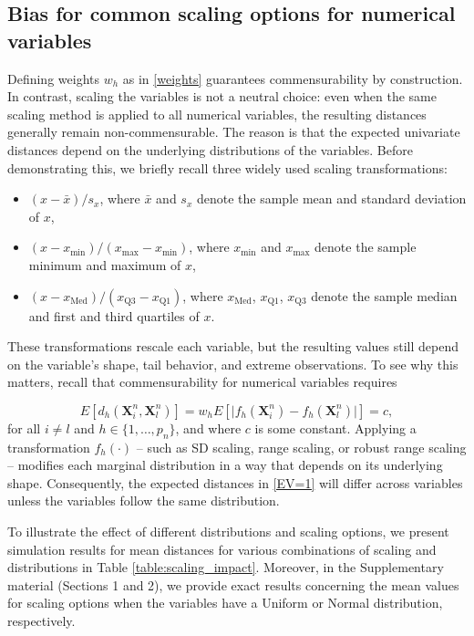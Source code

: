 \documentclass[12pt]{article}
\begin{document}
\subsection{Bias for common scaling options for numerical variables}\label{sect:comnumdist}
Defining weights $w_h$ as in \eqref{weights} guarantees commensurability by construction. In contrast, scaling the variables is not a neutral choice: even when the same scaling method is applied to all numerical variables, the resulting distances generally remain non-commensurable. The reason is that the expected univariate distances depend on the underlying distributions of the variables.
Before demonstrating this, we briefly recall three widely used scaling transformations:
\begin{itemize}
    \item[-]  $(x - \bar{x})/{s_x}$, where $\bar{x}$ and $s_x$ denote the sample mean and standard deviation of $x$,
    \item[-]  $(x - x_{\min})/(x_{\max} - x_{\min})$, where $x_{\min}$ and $x_{\max}$ denote the sample minimum and maximum of $x$,
    \item[-]  $(x - x_{\text{Med}})/(x_{\text{Q}3} - x_{\text{Q}1})$, where $x_{\text{Med}}$, $x_{\text{Q}1}$, $x_{\text{Q}3}$ denote the sample median and first and third quartiles of $x$.
\end{itemize}
These transformations rescale each variable, but the resulting values still depend on the variable’s shape, tail behavior, and extreme observations. To see why this matters, recall that commensurability for numerical variables requires

\begin{equation}\label{EV=1}
    E[d_{h}(\bm{X}^n_i,\bm{X}^n_l)]= w_h E[\lvert f_h(\bm{X}^n_i)-f_h(\bm{X}^n_l) \rvert]=c,
\end{equation}
for all $i \neq l$ and $h \in \{1, \dots, p_n\}$, and where $c$ is some constant. Applying a transformation $f_h(\cdot)$ -- such as SD scaling, range scaling, or robust range scaling -- modifies each marginal distribution in a way that depends on its underlying shape. Consequently, the expected distances in \eqref{EV=1} will differ across variables unless the variables follow the same distribution.

To illustrate the effect of different distributions and scaling options, we present simulation results for mean distances for various combinations of scaling and distributions in Table \ref{table:scaling_impact}. Moreover, in the Supplementary material (Sections 1 and 2), we provide exact results concerning the mean values for scaling options when the variables have a Uniform or Normal distribution, respectively.
\end{document}
